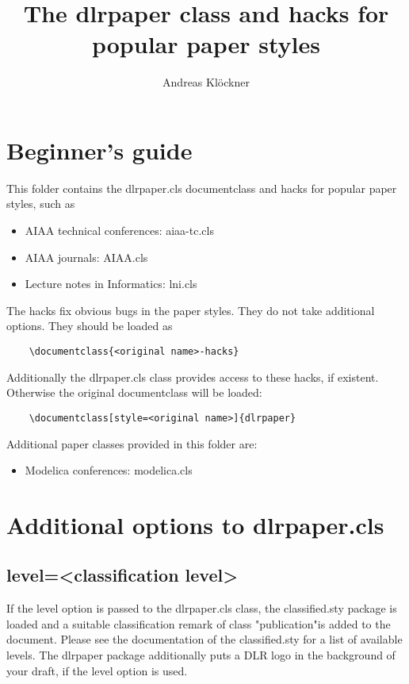 \documentclass[style=article,draft]{dlrpaper}
\title{The dlrpaper class and hacks for popular paper styles}
\author{Andreas Kl\"ockner}
\begin{document}
\maketitle

\section{Beginner's guide}
This folder contains the dlrpaper.cls documentclass and hacks for popular paper styles, such as
\begin{itemize}
	\item AIAA technical conferences: aiaa-tc.cls
	\item AIAA journals: AIAA.cls
	\item Lecture notes in Informatics: lni.cls
\end{itemize}

The hacks fix obvious bugs in the paper styles. They do not take additional options. They should be loaded as
\begin{verbatim}
	\documentclass{<original name>-hacks}
\end{verbatim}

Additionally the dlrpaper.cls class provides access to these hacks, if existent. Otherwise the original documentclass will be loaded:
\begin{verbatim}
	\documentclass[style=<original name>]{dlrpaper}
\end{verbatim}

Additional paper classes provided in this folder are:
\begin{itemize}
	\item Modelica conferences: modelica.cls
\end{itemize}

\section{Additional options to dlrpaper.cls}
\subsection{level=\textless classification level\textgreater}
If the level option is passed to the dlrpaper.cls class, the classified.sty package is loaded and a suitable classification remark of class "publication"\space is added to the document. Please see the documentation of the classified.sty for a list of available levels. The dlrpaper package additionally puts a DLR logo in the background of your draft, if the level option is used.
\end{document}

